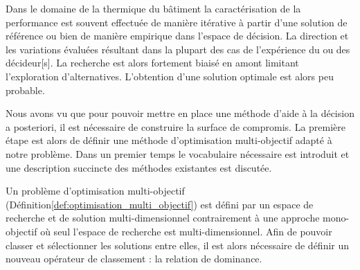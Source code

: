 
Dans le domaine de la thermique du bâtiment la caractérisation
de la performance est souvent effectuée de manière itérative à partir d’une solution
de référence ou bien de manière empirique dans l’espace de décision. La direction et
les variations évaluées résultant dans la plupart des cas de l’expérience du ou des
décideur[s]. La recherche est alors fortement biaisé en amont limitant l’exploration
d’alternatives. L’obtention d’une solution optimale est alors peu probable.

Nous avons vu que pour pouvoir mettre en place une méthode d’aide à la décision a posteriori, il
est nécessaire de construire la surface de compromis. La première étape est alors
de définir une méthode d’optimisation multi-objectif adapté à notre problème.
Dans un premier temps le vocabulaire nécessaire est introduit et une
description succincte des méthodes existantes est discutée.


Un problème d’optimisation multi-objectif (Définition\ref{def:optimisation_multi_objectif})
est défini par un espace de recherche et de solution multi-dimensionnel contrairement à
une approche mono-objectif où seul l’espace de recherche est multi-dimensionnel.
Afin de pouvoir classer et sélectionner les solutions entre elles, il est alors nécessaire de définir un
nouveau opérateur de classement : la relation de dominance.

